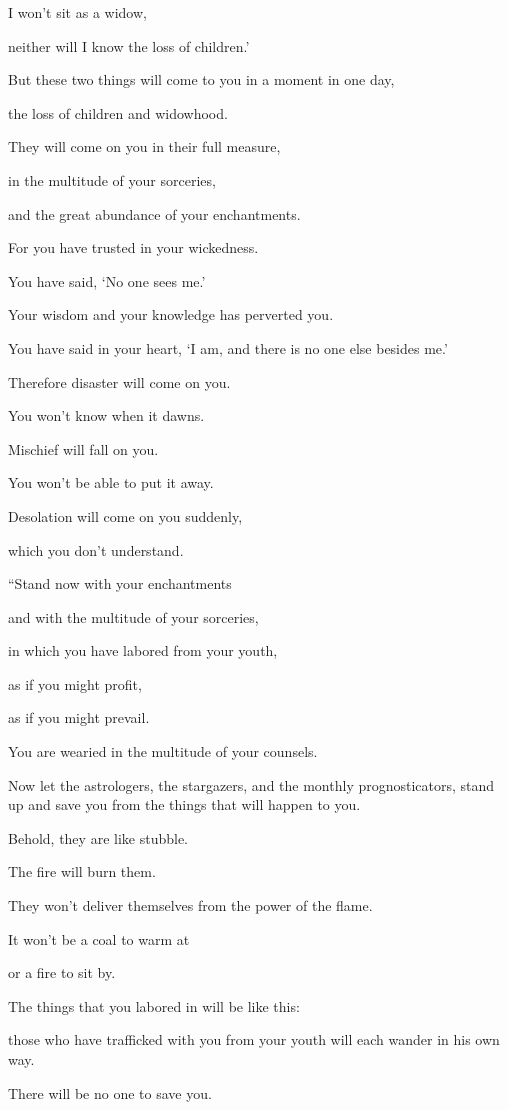 {\par }{\Q I won’t sit as a widow,
\par }{\QB neither will I know the loss of children.’
\par }{\Q {}But these two things will come to you in a moment in one day,
\par }{\QB the loss of children and widowhood.
\par }{\Q They will come on you in their full measure,
\par }{\QB in the multitude of your sorceries,
\par }{\QB and the great abundance of your enchantments.
\par }{\Q {}For you have trusted in your wickedness.
\par }{\QB You have said, ‘No one sees me.’
\par }{\Q Your wisdom and your knowledge has perverted you.
\par }{\QB You have said in your heart, ‘I am, and there is no one else besides me.’
\par }{\Q {}Therefore disaster will come on you.
\par }{\QB You won’t know when it dawns.
\par }{\Q Mischief will fall on you.
\par }{\QB You won’t be able to put it away.
\par }{\Q Desolation will come on you suddenly,
\par }{\QB which you don’t understand.
\par }{\BB \par }{\Q {}“Stand now with your enchantments
\par }{\QB and with the multitude of your sorceries,
\par }{\QB in which you have labored from your youth,
\par }{\Q as if you might profit,
\par }{\QB as if you might prevail.
\par }{\Q {}You are wearied in the multitude of your counsels.
\par }{\QB Now let the astrologers, the stargazers, and the monthly prognosticators, stand up and save you from the things that will happen to you.
\par }{\Q {}Behold, they are like stubble.
\par }{\QB The fire will burn them.
\par }{\QB They won’t deliver themselves from the power of the flame.
\par }{\Q It won’t be a coal to warm at
\par }{\QB or a fire to sit by.
\par }{\Q {}The things that you labored in will be like this:
\par }{\QB those who have trafficked with you from your youth will each wander in his own way.
\par }{\QB There will be no one to save you.
\par }{\BB \par }
